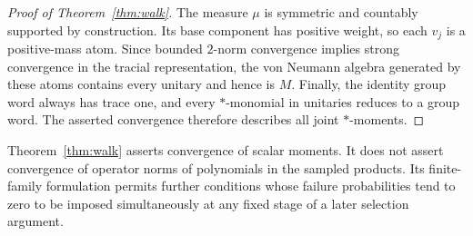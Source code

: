 \begin{proof}[Proof of Theorem~\ref{thm:walk}]
The measure $\mu$ is symmetric and countably supported by construction.
Its base component has positive weight, so each $v_j$ is a
positive-mass atom.  Since bounded $2$-norm convergence implies strong
convergence in the tracial representation, the von Neumann algebra
generated by these atoms contains every unitary and hence is $M$.
Finally, the identity group word always has trace one, and every
$*$-monomial in unitaries reduces to a group word.  The asserted
convergence therefore describes all joint $*$-moments.
\end{proof}

\begin{remark}\label{rem:walk-only-moments}
Theorem~\ref{thm:walk} asserts convergence of scalar moments.  It does
not assert convergence of operator norms of polynomials in the sampled
products.  Its finite-family formulation permits further conditions
whose failure probabilities tend to zero to be imposed simultaneously
at any fixed stage of a later selection argument.
\end{remark}
